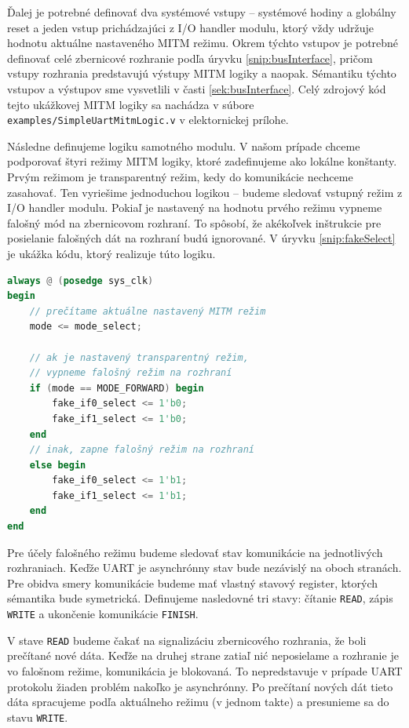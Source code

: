 Ďalej je potrebné definovať dva systémové vstupy -- systémové hodiny a globálny reset a jeden vstup prichádzajúci z I/O handler modulu, ktorý vždy udržuje hodnotu aktuálne nastaveného MITM režimu. Okrem týchto vstupov je potrebné definovať celé zbernicové rozhranie podľa úryvku \ref{snip:busInterface}, pričom vstupy rozhrania predstavujú výstupy MITM logiky a naopak. Sémantiku týchto vstupov a výstupov sme vysvetlili v časti \ref{sek:busInterface}. Celý zdrojový kód tejto ukážkovej MITM logiky sa nachádza v súbore \texttt{examples/SimpleUartMitmLogic.v} v elektornickej prílohe.

Následne definujeme logiku samotného modulu. V našom prípade chceme podporovať štyri režimy MITM logiky, ktoré zadefinujeme ako lokálne konštanty. Prvým režimom je transparentný režim, kedy do komunikácie nechceme zasahovať. Ten vyriešime jednoduchou logikou -- budeme sledovať vstupný režim z I/O handler modulu. Pokiaľ je nastavený na hodnotu prvého režimu vypneme falošný mód na zbernicovom rozhraní. To spôsobí, že akékoľvek inštrukcie pre posielanie falošných dát na rozhraní budú ignorované. V úryvku \ref{snip:fakeSelect} je ukážka kódu, ktorý realizuje túto logiku.

\begin{lstlisting}[float,language=Verilog,caption={Prepínanie medzi transparantným a falošným režimom MITM logiky.},label=snip:fakeSelect]
always @ (posedge sys_clk)
begin
    // prečítame aktuálne nastavený MITM režim
    mode <= mode_select;

    // ak je nastavený transparentný režim,
    // vypneme falošný režim na rozhraní
    if (mode == MODE_FORWARD) begin
        fake_if0_select <= 1'b0;
        fake_if1_select <= 1'b0;
    end
    // inak, zapne falošný režim na rozhraní
    else begin
        fake_if0_select <= 1'b1;
        fake_if1_select <= 1'b1;
    end
end
\end{lstlisting}

Pre účely falošného režimu budeme sledovať stav komunikácie na jednotlivých rozhraniach. Keďže UART je asynchrónny stav bude nezávislý na oboch stranách. Pre obidva smery komunikácie budeme mať vlastný stavový register, ktorých sémantika bude symetrická. Definujeme nasledovné tri stavy: čítanie \texttt{READ}, zápis \texttt{WRITE} a ukončenie komunikácie \texttt{FINISH}.

V stave \texttt{READ} budeme čakať na signalizáciu zbernicového rozhrania, že boli prečítané nové dáta. Keďže na druhej strane zatiaľ nić neposielame a rozhranie je vo falošnom režime, komunikácia je blokovaná. To nepredstavuje v prípade UART protokolu žiaden problém nakoľko je asynchrónny. Po prečítaní nových dát tieto dáta spracujeme podľa aktuálneho režimu (v jednom takte) a presunieme sa do stavu \texttt{WRITE}.

